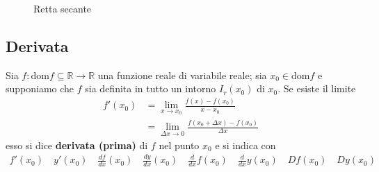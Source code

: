 \documentclass{book}
\begin{document}
\begin{figure}[H]
    \caption{Retta secante}
\end{figure}

\noindent\begin{minipage}{\textwidth}
    \begin{definition}
        \subsection{Derivata}
        Sia $f: \text{dom} f \subseteq \mathbb{R} \to \mathbb{R}$ una funzione reale di variabile reale; sia $x_0 \in \text{dom} f$ e supponiamo che $f$ sia definita in tutto un intorno $I_{r}(x_0)$ di $x_0$. Se esiste il limite
        \begin{align}
            f'(x_0) & = \lim_{x \to x_0} \frac{f(x) - f(x_0)}{x - x_0}                    \\
                    & = \lim_{\Delta x \to 0} \frac{f(x_0 + \Delta x) - f(x_0)}{\Delta x}
        \end{align}
        esso si dice \textbf{derivata (prima)} di $f$ nel punto $x_0$ e si indica con
        \begin{align}
            f'(x_0) \quad y'(x_0) \quad \frac{df}{dx}(x_0) \quad \frac{dy}{dx}(x_0) \quad \frac{d}{dx}f(x_0) \quad \frac{d}{dx}y(x_0) \quad Df(x_0) \quad Dy(x_0)
        \end{align}
    \end{definition}

\end{minipage}
\end{document}
